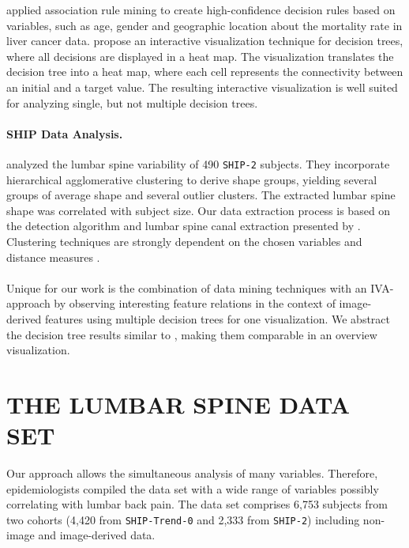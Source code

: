 \documentclass[a4paper,twoside]{style/article}
\begin{document}
\cite{Pinheiro} applied association rule mining to create high-confidence decision rules based on variables, such as age, gender and geographic location about the mortality rate in liver cancer data.
\cite{Sekhavat} propose an interactive visualization technique for decision trees, where all decisions are displayed in a heat map.
The visualization translates the decision tree into a heat map, where each cell represents the connectivity between an initial and a target value.
The resulting interactive visualization is well suited for analyzing single, but not multiple decision trees.
\paragraph{SHIP Data Analysis.}
\cite{Klemm2013VMV} analyzed the lumbar spine variability of 490 \texttt{SHIP-2} subjects.
They incorporate hierarchical agglomerative clustering to derive shape groups, yielding several groups of average shape and several outlier clusters.
The extracted lumbar spine shape was correlated with subject size.
Our data extraction process is based on the detection algorithm and lumbar spine canal extraction presented by \cite{Klemm2013VMV}.
Clustering techniques are strongly dependent on the chosen variables and distance measures \cite{Klemm2014BVM}.
\\\\
Unique for our work is the combination of data mining techniques with an IVA-approach by observing interesting feature relations in the context of image-derived features using multiple decision trees for one visualization.
We abstract the decision tree results similar to \cite{Turkay}, making them comparable in an overview visualization.
\section{\uppercase{The Lumbar Spine Data Set}}
\label{sec:MaterialsAndMethod}
\noindent Our approach allows the simultaneous analysis of many variables.
Therefore, epidemiologists compiled the data set with a wide range of variables possibly correlating with lumbar back pain.
The data set comprises 6,753 subjects from two cohorts (4,420 from \texttt{SHIP-Trend-0} and 2,333 from \texttt{SHIP-2}) including non-image and image-derived data.
\end{document}
